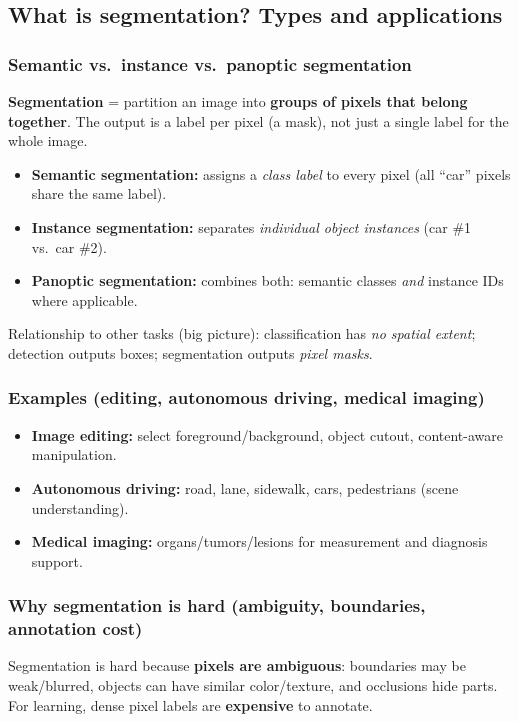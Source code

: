 \documentclass[11pt,a4paper]{article}
\begin{document}
\subsection{What is segmentation? Types and applications}

\subsubsection{Semantic vs.\ instance vs.\ panoptic segmentation}

\begin{defbox}
\textbf{Segmentation} = partition an image into \textbf{groups of pixels that belong together}.
The output is a label per pixel (a mask), not just a single label for the whole image.
\end{defbox}

\begin{itemize}
  \item \textbf{Semantic segmentation:} assigns a \emph{class label} to every pixel (all ``car'' pixels share the same label).
  \item \textbf{Instance segmentation:} separates \emph{individual object instances} (car \#1 vs.\ car \#2).
  \item \textbf{Panoptic segmentation:} combines both: semantic classes \emph{and} instance IDs where applicable.
\end{itemize}

\begin{notebox}
Relationship to other tasks (big picture): classification has \emph{no spatial extent}; detection outputs boxes; segmentation outputs \emph{pixel masks}.
\end{notebox}

\subsubsection{Examples (editing, autonomous driving, medical imaging)}
\begin{itemize}
  \item \textbf{Image editing:} select foreground/background, object cutout, content-aware manipulation.
  \item \textbf{Autonomous driving:} road, lane, sidewalk, cars, pedestrians (scene understanding).
  \item \textbf{Medical imaging:} organs/tumors/lesions for measurement and diagnosis support.
\end{itemize}

\subsubsection{Why segmentation is hard (ambiguity, boundaries, annotation cost)}
\begin{intbox}
Segmentation is hard because \textbf{pixels are ambiguous}: boundaries may be weak/blurred, objects can have similar color/texture,
and occlusions hide parts. For learning, dense pixel labels are \textbf{expensive} to annotate.
\end{intbox}
\end{document}
